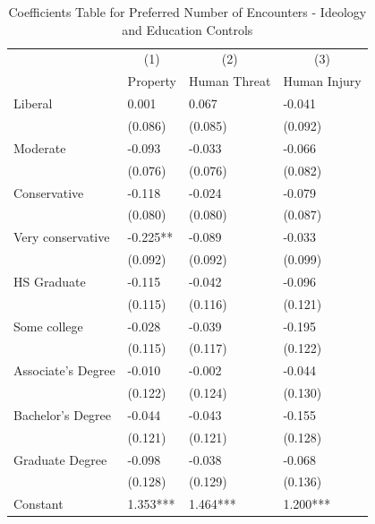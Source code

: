 \documentclass[english,12pt]{article}
\begin{document}
\begin{table}[H]
    \centering
    \caption{Coefficients Table for Preferred Number of Encounters - Ideology and Education Controls}
    \footnotesize
    \begin{tabular}{@{}llll@{}}
        \toprule
                           &\multicolumn{1}{c}{(1)}   &\multicolumn{1}{c}{(2)}   &\multicolumn{1}{c}{(3)}  \\
                           & Property & Human Threat & Human Injury \\ \midrule
        Liberal     &       0.001   &       0.067   &      -0.041   \\
                    &     (0.086)   &     (0.085)   &     (0.092)   \\
        Moderate    &      -0.093   &      -0.033   &      -0.066   \\
                    &     (0.076)   &     (0.076)   &     (0.082)   \\
        Conservative&      -0.118   &      -0.024   &      -0.079   \\
                    &     (0.080)   &     (0.080)   &     (0.087)   \\
        Very conservative&      -0.225** &      -0.089   &      -0.033   \\
                    &     (0.092)   &     (0.092)   &     (0.099)   \\
        HS Graduate &      -0.115   &      -0.042   &      -0.096   \\
                    &     (0.115)   &     (0.116)   &     (0.121)   \\
        Some college&      -0.028   &      -0.039   &      -0.195   \\
                    &     (0.115)   &     (0.117)   &     (0.122)   \\
        Associate's Degree&      -0.010   &      -0.002   &      -0.044   \\
                    &     (0.122)   &     (0.124)   &     (0.130)   \\
        Bachelor's Degree&      -0.044   &      -0.043   &      -0.155   \\
                    &     (0.121)   &     (0.121)   &     (0.128)   \\
        Graduate Degree&      -0.098   &      -0.038   &      -0.068   \\
                    &     (0.128)   &     (0.129)   &     (0.136)   \\\midrule                       
        Constant    &       1.353***&       1.464***&       1.200***\\

\end{tabular}
\end{table}
\end{document}
